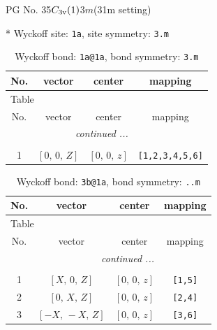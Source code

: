 \documentclass[fleqn,8pt]{jsarticle}
\begin{document}
\setcounter{MaxMatrixCols}{32}

\renewcommand{\tablename}{Table~}
\renewcommand{\figurename}{Figure~}
\begin{center}
\LARGE
PG No. 35\quad$C_{\rm 3v}(1)$\quad$3m$\quad(31m setting)\quad[ trigonal ]
\end{center}


* Wyckoff site: {\tt 1a}, site symmetry: {\tt 3.m}
\renewcommand{\arraystretch}{1.2}
\begin{longtable}{cccc}
\caption{Wyckoff bond: {\tt 1a@1a}, bond symmetry: {\tt 3.m}}
 \\
 \hline \hline
No. & vector & center & mapping \\ \hline \endfirsthead

\multicolumn{3}{l}{\tablename\ \thetable{}} \\
 \hline \hline
No. & vector & center & mapping \\ \hline \endhead

 \hline \hline
\multicolumn{3}{r}{\footnotesize\it continued ...} \\ \endfoot

 \hline \hline
\multicolumn{3}{r}{} \\ \endlastfoot

1 & $\left[ 0,\, 0,\, Z \right]$ & $\left[ 0,\, 0,\, z \right]$ & {\tt [1,2,3,4,5,6]} \\
\end{longtable}
\renewcommand{\arraystretch}{1.2}
\begin{longtable}{cccc}
\caption{Wyckoff bond: {\tt 3b@1a}, bond symmetry: {\tt ..m}}
 \\
 \hline \hline
No. & vector & center & mapping \\ \hline \endfirsthead

\multicolumn{3}{l}{\tablename\ \thetable{}} \\
 \hline \hline
No. & vector & center & mapping \\ \hline \endhead

 \hline \hline
\multicolumn{3}{r}{\footnotesize\it continued ...} \\ \endfoot

 \hline \hline
\multicolumn{3}{r}{} \\ \endlastfoot

1 & $\left[ X,\, 0,\, Z \right]$ & $\left[ 0,\, 0,\, z \right]$ & {\tt [1,5]} \\ \hline
2 & $\left[ 0,\, X,\, Z \right]$ & $\left[ 0,\, 0,\, z \right]$ & {\tt [2,4]} \\ \hline
3 & $\left[ - X,\, - X,\, Z \right]$ & $\left[ 0,\, 0,\, z \right]$ & {\tt [3,6]} \\
\end{longtable}
\end{document}
